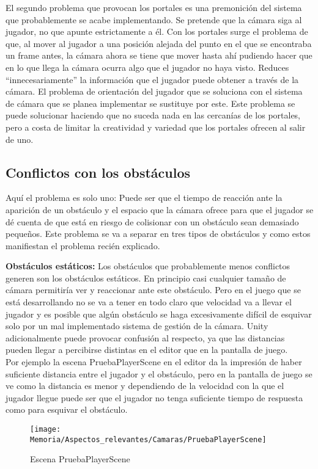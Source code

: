 El segundo problema que provocan los portales es una premonición del sistema que probablemente se acabe implementando. Se pretende que la cámara siga al jugador, no que apunte estrictamente a él. Con los portales surge el problema de que, al mover al jugador a una posición alejada del punto en el que se encontraba un frame antes, la cámara ahora se tiene que mover hasta ahí pudiendo hacer que en lo que llega la cámara ocurra algo que el jugador no haya visto. Reduces “innecesariamente” la información que el jugador puede obtener a través de la cámara. El problema de orientación del jugador que se soluciona con el sistema de cámara que se planea implementar se sustituye por este. Este problema se puede solucionar haciendo que no suceda nada en las cercanías de los portales, pero a costa de limitar la creatividad y variedad que los portales ofrecen al salir de uno.

\subsection{Conflictos con los obstáculos}
Aquí el problema es solo uno: Puede ser que el tiempo de reacción ante la aparición de un obstáculo y el espacio que la cámara ofrece para que el jugador se dé cuenta de que está en riesgo de colisionar con un obstáculo sean demasiado pequeños. Este problema se va a separar en tres tipos de obstáculos y como estos manifiestan el problema recién explicado.

\textbf{Obstáculos estáticos:} Los obstáculos que probablemente menos conflictos generen son los obstáculos estáticos. En principio casi cualquier tamaño de cámara permitiría ver y reaccionar ante este obstáculo. Pero en el juego que se está desarrollando no se va a tener en todo claro que velocidad va a llevar el jugador y es posible que algún obstáculo se haga excesivamente difícil de esquivar solo por un mal implementado sistema de gestión de la cámara. Unity adicionalmente puede provocar confusión al respecto, ya que las distancias pueden llegar a percibirse distintas en el editor que en la pantalla de juego.\\
Por ejemplo la escena PruebaPlayerScene en el editor da la impresión de haber suficiente distancia entre el jugador y el obstáculo, pero en la pantalla de juego se ve como la distancia es menor y dependiendo de la velocidad con la que el jugador llegue puede ser que el jugador no tenga suficiente tiempo de respuesta como para esquivar el obstáculo.

\begin{figure}[h]
\texttt{[image: Memoria/Aspectos\_relevantes/Camaras/PruebaPlayerScene]}
\caption{Escena PruebaPlayerScene}
\end{figure}

